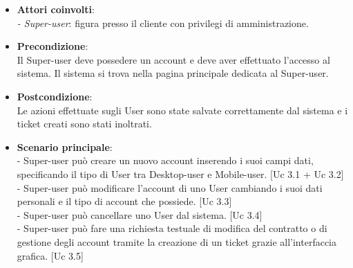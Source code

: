 \documentclass[10pt,a4paper]{article}
\begin{document}
\begin{itemize}

\item \textbf{Attori coinvolti}:\\
\emph{- Super-user}: figura presso il cliente con privilegi di amministrazione.

\item \textbf{Precondizione}:\\
Il Super-user deve possedere un account e deve aver effettuato l'accesso al sistema. Il sistema si trova nella pagina principale dedicata al Super-user.

\item \textbf{Postcondizione}:\\
Le azioni effettuate sugli User sono state salvate correttamente dal sistema e i ticket creati sono stati inoltrati.

\item \textbf{Scenario principale}:\\
- Super-user può creare un nuovo account inserendo i suoi campi dati, specificando il tipo di User tra Desktop-user e Mobile-user. [Uc 3.1 + Uc 3.2]\\
- Super-user può modificare l'account di uno User cambiando i suoi dati personali e il tipo di account che possiede. [Uc 3.3]\\
- Super-user può cancellare uno User dal sistema. [Uc 3.4]\\
- Super-user può fare una richiesta testuale di modifica del contratto o di gestione degli account tramite la creazione di un ticket grazie all'interfaccia grafica. [Uc 3.5]
\end{itemize}

\newpage
\end{document}
